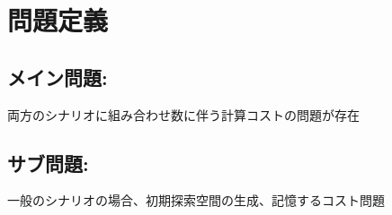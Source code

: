 \chapter{問題定義}\label{chap:problem_def}
\section{メイン問題:}\label{sec:main_problem}
両方のシナリオに組み合わせ数に伴う計算コストの問題が存在
\section{サブ問題:}\label{sec:sub_problem}
一般のシナリオの場合、初期探索空間の生成、記憶するコスト問題